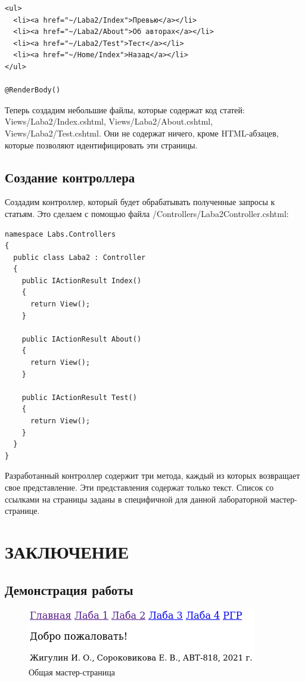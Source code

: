 \documentclass[a4paper,14pt]{extreport}
\begin{document}
\begin{verbatim}
<ul>
  <li><a href="~/Laba2/Index">Превью</a></li>
  <li><a href="~/Laba2/About">Об авторах</a></li>
  <li><a href="~/Laba2/Test">Тест</a></li>
  <li><a href="~/Home/Index">Назад</a></li>
</ul>

@RenderBody()
\end{verbatim}

Теперь создадим небольшие файлы, которые содержат код статей: Views/Laba2/Index.cshtml, Views/Laba2/About.cshtml, Views/Laba2/Test.cshtml. Они не содержат ничего, кроме HTML-абзацев, которые позволяют идентифицировать эти страницы.

\section{Создание контроллера}
Создадим контроллер, который будет обрабатывать полученные запросы к статьям. Это сделаем с помощью файла /Controllers/Laba2Controller.cshtml:

\begin{verbatim}
namespace Labs.Controllers
{
  public class Laba2 : Controller
  {        
    public IActionResult Index()
    {
      return View();
    }
		
    public IActionResult About()
    {
      return View();
    }
		
    public IActionResult Test()
    {
      return View();
    }
  }
}
\end{verbatim}

Разработанный контроллер содержит три метода, каждый из которых возвращает свое представление. Эти представления содержат только текст. Список со ссылками на страницы заданы в специфичной для данной лабораторной мастер-странице.


\chapter{ЗАКЛЮЧЕНИЕ}

\section{Демонстрация работы}


\begin{figure}[H]
	\centering
	\includegraphics{01}
	\caption{Общая мастер-страница}
\end{figure}
\end{document}
